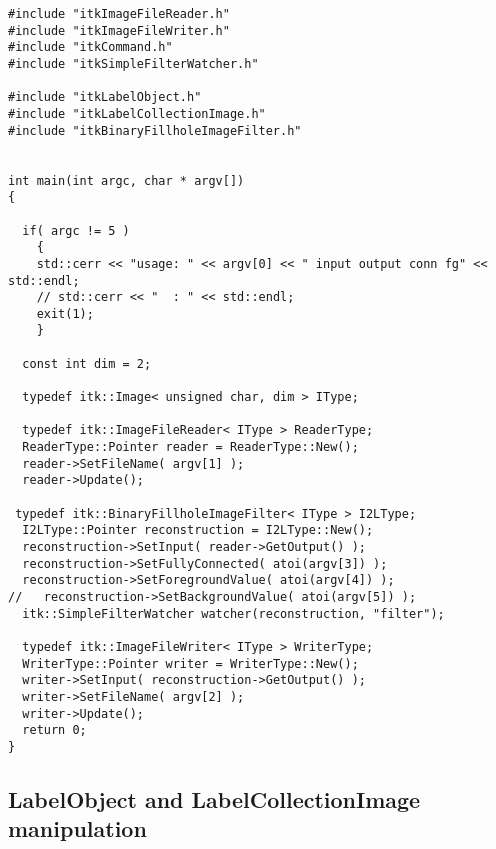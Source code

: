 \documentclass{InsightArticle}
\begin{document}
\small \begin{verbatim}
#include "itkImageFileReader.h"
#include "itkImageFileWriter.h"
#include "itkCommand.h"
#include "itkSimpleFilterWatcher.h"

#include "itkLabelObject.h"
#include "itkLabelCollectionImage.h"
#include "itkBinaryFillholeImageFilter.h"


int main(int argc, char * argv[])
{

  if( argc != 5 )
    {
    std::cerr << "usage: " << argv[0] << " input output conn fg" << std::endl;
    // std::cerr << "  : " << std::endl;
    exit(1);
    }

  const int dim = 2;

  typedef itk::Image< unsigned char, dim > IType;

  typedef itk::ImageFileReader< IType > ReaderType;
  ReaderType::Pointer reader = ReaderType::New();
  reader->SetFileName( argv[1] );
  reader->Update();

 typedef itk::BinaryFillholeImageFilter< IType > I2LType;
  I2LType::Pointer reconstruction = I2LType::New();
  reconstruction->SetInput( reader->GetOutput() );
  reconstruction->SetFullyConnected( atoi(argv[3]) );
  reconstruction->SetForegroundValue( atoi(argv[4]) );
//   reconstruction->SetBackgroundValue( atoi(argv[5]) );
  itk::SimpleFilterWatcher watcher(reconstruction, "filter");

  typedef itk::ImageFileWriter< IType > WriterType;
  WriterType::Pointer writer = WriterType::New();
  writer->SetInput( reconstruction->GetOutput() );
  writer->SetFileName( argv[2] );
  writer->Update();
  return 0;
}
\end{verbatim} \normalsize

\subsection{LabelObject and LabelCollectionImage manipulation}

% 
% 
% 
% 
% 
% 
\end{document}

